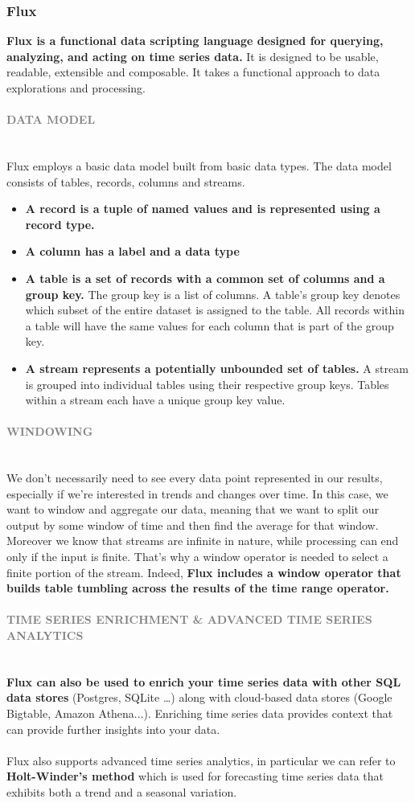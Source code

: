 \documentclass[10pt,a4paper]{article}
\newcommand{\nline}{\\~\\}
\newcommand{\myparagraph}[1]{\paragraph{\normalsize{\textcolor{gray}{\uppercase{\textbf{#1}}}} }\mbox{} \vspace{0.5em}\\}
\begin{document}
\subsubsection{Flux}
\textbf{Flux is a functional data scripting language designed for querying, analyzing, and acting on time series data.} It is designed to be usable, readable, extensible and composable. It takes a functional approach to data explorations and processing.
\myparagraph{Data Model}
Flux employs a basic data model built from basic data types. The data model consists of tables, records, columns and streams.
\begin{itemize}
	\item \textbf{A record is a tuple of named values and is represented using a record type.}
	\item \textbf{A column has a label and a data type}
	\item \textbf{A table is a set of records with a common set of columns and a group key.} The group key is a list of columns. A table’s group key denotes which subset of the entire dataset is assigned to the table. All records within a table will have the same values for each column that is part of the group key.
	\item \textbf{A stream represents a potentially unbounded set of tables.} A stream is grouped into individual tables using their respective group keys. Tables within a stream each have a unique group key value.
\end{itemize}
\myparagraph{Windowing}
We don’t necessarily need to see every data point represented in our results, especially if we’re interested in trends and changes over time. In this case, we want to window and aggregate our data, meaning that we want to split our output by some window of time and then find the average for that window. \\
Moreover we know that streams are infinite in nature, while processing can end only if the input is finite. That’s why a window operator is needed to select a finite portion of the stream. Indeed, \textbf{Flux includes a window operator that builds table tumbling across the results of the time range operator.}
\myparagraph{Time Series Enrichment \& Advanced Time Series Analytics}
\textbf{Flux can also be used to enrich your time series data with other SQL data stores} (Postgres, SQLite …) along with cloud-based data stores (Google Bigtable, Amazon Athena...). Enriching time series data provides context that can provide further insights into your data.
\nline
Flux also supports advanced time series analytics, in particular we can refer to \textbf{Holt-Winder’s method} which is used for forecasting time series data that exhibits both a trend and a seasonal variation.
\end{document}
